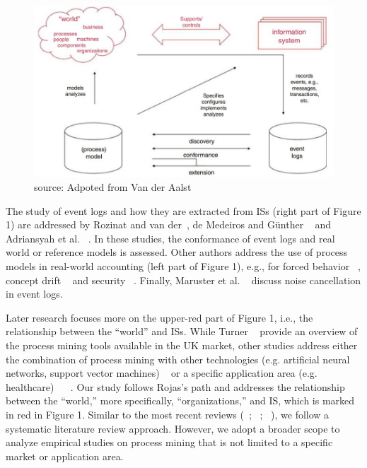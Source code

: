 \begin{figure}[!htb]
    \centering 
    \includegraphics[scale=0.7]{resource/BPMJ.JPG}
    \caption{source: Adpoted from Van der Aalst ~\cite{van2011process}}
    \label{figure:BPMJ}
\end{figure}



The study of event logs and how they are extracted from ISs (right part of Figure 1) are addressed by Rozinat and van der~\cite{rozinat2006decision}, de Medeiros and Günther ~\cite{de2005process} and Adriansyah et al. ~\cite{adriansyah2011conformance}. In these studies, the conformance of event logs and real world or reference models is assessed. Other authors address the use of process models in real-world accounting (left part of Figure 1), e.g., for forced behavior ~\cite{wen2009novel}, concept drift ~\cite{engel2014case} and security ~\cite{van2005process}. Finally, Maruster et al. ~\cite{muarucster2006rule} discuss noise cancellation in event logs.

Later research focuses more on the upper-red part of Figure 1, i.e., the relationship between the “world” and ISs. While Turner ~\cite{turner2012process} provide an overview of the process mining tools available in the UK market, other studies address either the combination of process mining with other technologies (e.g. artificial neural networks, support vector machines) ~\cite{maita2015ultraflexible} or a specific application area (e.g. healthcare) ~\cite{rojas2016process} ~\cite{yang2014process}. Our study follows Rojas’s path and addresses the relationship between the “world,” more specifically, “organizations,” and IS, which is marked in red in Figure 1. Similar to the most recent reviews (~\cite{kurniati2016process}; ~\cite{maita2015process}; ~\cite{rojas2016process}), we follow a systematic literature review approach. However, we adopt a broader scope to analyze empirical studies on process mining that is not limited to a specific market or application area.



